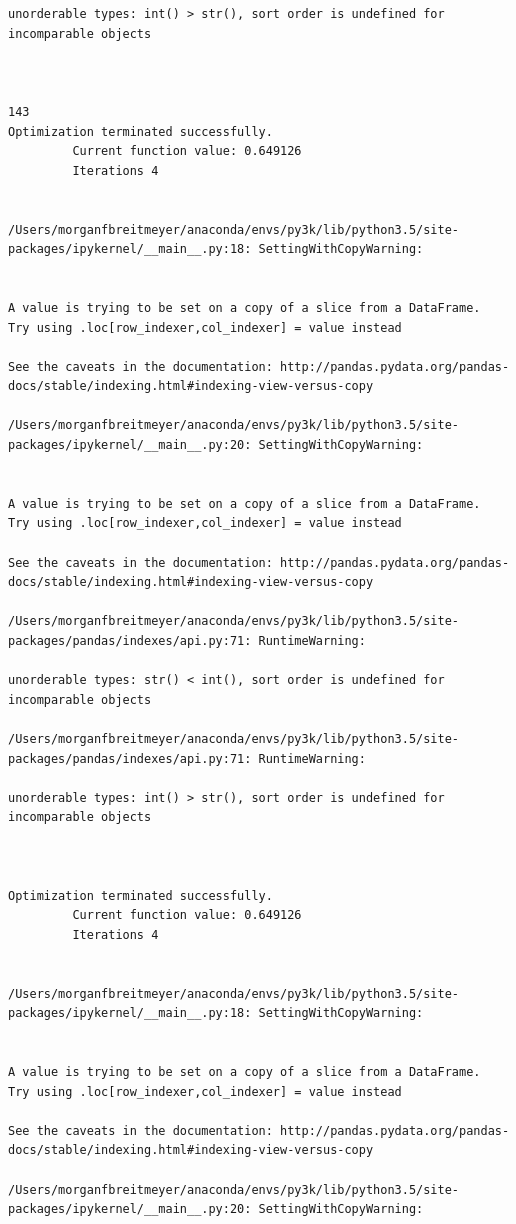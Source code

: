 \begin{lstlisting}
unorderable types: int() > str(), sort order is undefined for incomparable objects



143
Optimization terminated successfully.
         Current function value: 0.649126
         Iterations 4


/Users/morganfbreitmeyer/anaconda/envs/py3k/lib/python3.5/site-packages/ipykernel/__main__.py:18: SettingWithCopyWarning:


A value is trying to be set on a copy of a slice from a DataFrame.
Try using .loc[row_indexer,col_indexer] = value instead

See the caveats in the documentation: http://pandas.pydata.org/pandas-docs/stable/indexing.html#indexing-view-versus-copy

/Users/morganfbreitmeyer/anaconda/envs/py3k/lib/python3.5/site-packages/ipykernel/__main__.py:20: SettingWithCopyWarning:


A value is trying to be set on a copy of a slice from a DataFrame.
Try using .loc[row_indexer,col_indexer] = value instead

See the caveats in the documentation: http://pandas.pydata.org/pandas-docs/stable/indexing.html#indexing-view-versus-copy

/Users/morganfbreitmeyer/anaconda/envs/py3k/lib/python3.5/site-packages/pandas/indexes/api.py:71: RuntimeWarning:

unorderable types: str() < int(), sort order is undefined for incomparable objects

/Users/morganfbreitmeyer/anaconda/envs/py3k/lib/python3.5/site-packages/pandas/indexes/api.py:71: RuntimeWarning:

unorderable types: int() > str(), sort order is undefined for incomparable objects



Optimization terminated successfully.
         Current function value: 0.649126
         Iterations 4


/Users/morganfbreitmeyer/anaconda/envs/py3k/lib/python3.5/site-packages/ipykernel/__main__.py:18: SettingWithCopyWarning:


A value is trying to be set on a copy of a slice from a DataFrame.
Try using .loc[row_indexer,col_indexer] = value instead

See the caveats in the documentation: http://pandas.pydata.org/pandas-docs/stable/indexing.html#indexing-view-versus-copy

/Users/morganfbreitmeyer/anaconda/envs/py3k/lib/python3.5/site-packages/ipykernel/__main__.py:20: SettingWithCopyWarning:



\end{lstlisting}
